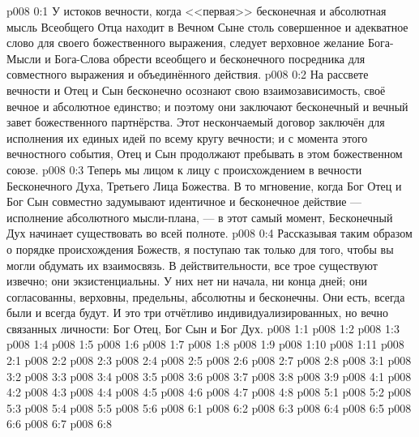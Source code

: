 \author{Божественный Советник}
\vs p008 0:1 У истоков вечности, когда <<первая>> бесконечная и абсолютная мысль Всеобщего Отца находит в Вечном Сыне столь совершенное и адекватное слово для своего божественного выражения, следует верховное желание Бога\hyp{}Мысли и Бога\hyp{}Слова обрести всеобщего и бесконечного посредника для совместного выражения и объединённого действия.
\vs p008 0:2 На рассвете вечности и Отец и Сын бесконечно осознают свою взаимозависимость, своё вечное и абсолютное единство; и поэтому они заключают бесконечный и вечный завет божественного партнёрства. Этот нескончаемый договор заключён для исполнения их единых идей по всему кругу вечности; и с момента этого вечностного события, Отец и Сын продолжают пребывать в этом божественном союзе.
\vs p008 0:3 Теперь мы лицом к лицу с происхождением в вечности Бесконечного Духа, Третьего Лица Божества. В то мгновение, когда Бог Отец и Бог Сын совместно задумывают идентичное и бесконечное действие --- исполнение абсолютного мысли\hyp{}плана, --- в этот самый момент, Бесконечный Дух начинает существовать во всей полноте.
\vs p008 0:4 \pc Рассказывая таким образом о порядке происхождения Божеств, я поступаю так только для того, чтобы вы могли обдумать их взаимосвязь. В действительности, все трое существуют извечно; они экзистенциальны. У них нет ни начала, ни конца дней; они согласованны, верховны, предельны, абсолютны и бесконечны. Они есть, всегда были и всегда будут. И это три отчётливо индивидуализированных, но вечно связанных личности: Бог Отец, Бог Сын и Бог Дух.
\vs p008 1:1 
\vs p008 1:2 
\vs p008 1:3 
\vs p008 1:4 \pc 
\vs p008 1:5 
\vs p008 1:6 
\vs p008 1:7 \pc 
\vs p008 1:8 \pc 
\vs p008 1:9 
\vs p008 1:10 \pc 
\vs p008 1:11 
\vs p008 2:1 
\vs p008 2:2 \pc 
\vs p008 2:3 
\vs p008 2:4 \pc 
\vs p008 2:5 \pc 
\vs p008 2:6 
\vs p008 2:7 
\vs p008 2:8 
\vs p008 3:1 
\vs p008 3:2 
\vs p008 3:3 
\vs p008 3:4 
\vs p008 3:5 \pc 
\vs p008 3:6 
\vs p008 3:7 
\vs p008 3:8 
\vs p008 3:9 
\vs p008 4:1 
\vs p008 4:2 
\vs p008 4:3 
\vs p008 4:4 \pc 
\vs p008 4:5 
\vs p008 4:6 
\vs p008 4:7 \pc 
\vs p008 4:8 
\vs p008 5:1 
\vs p008 5:2 
\vs p008 5:3 \pc 
\vs p008 5:4 \pc 
\vs p008 5:5 
\vs p008 5:6 
\vs p008 6:1 
\vs p008 6:2 
\vs p008 6:3 
\vs p008 6:4 
\vs p008 6:5 
\vs p008 6:6 \pc 
\vs p008 6:7 
\vsetoff
\vs p008 6:8 
\quizlink
